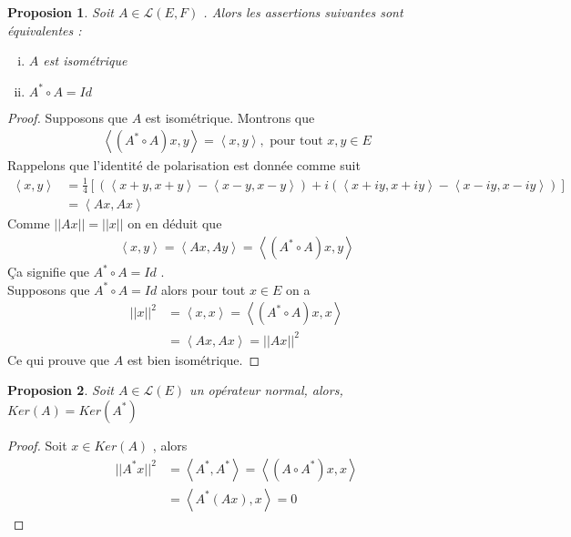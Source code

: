 \documentclass{report}
\newtheorem{Prop}{Proposion}[subsection]
\begin{document}
{\begin{Prop} Soit $A \in \mathscr{L}(E,F)$ . Alors les assertions suivantes sont équivalentes : \\
	\begin{enumerate}[i)]
	\item $A$ est isométrique \\
	\item $A^* \circ A = Id$ \\
	\end{enumerate}
\end{Prop}
\begin{proof}
Supposons que $A$ est isométrique. Montrons que 
					\begin{align*}
					 \left< (A^* \circ A)x,y \right> = \left< x,y \right> , \,\,\text{pour tout}\,\, x,y \in E
					\end{align*}
Rappelons que l'identité de polarisation est donnée comme suit 
					\begin{align*}
					 \left< x,y \right> &= \frac{1}{4} [ (\left< x+y,x+y \right> - \left< x-y,x-y \right>) + i(\left< x+iy,x+iy \right> - \left< x-iy,x-iy \right>) ] \\
					  		  &= \left< Ax,Ax \right>
					\end{align*}
Comme $||Ax|| = ||x||$ on en déduit que 
					\begin{align*}
					 \left< x,y \right> = \left< Ax,Ay \right> = \left< (A^*\circ A)x,y \right>
					\end{align*}
Ça signifie que $A^* \circ A = Id$ .\\
Supposons que $A^* \circ A = Id$ alors pour tout $x \in E$ on a 
					\begin{align*}
					 ||x||^2 &= \left< x,x \right> = \left< (A^*\circ A)x,x \right> \\
					 &= \left< Ax,Ax \right> = ||Ax||^2
					\end{align*}
Ce qui prouve que $A$ est bien isométrique.
\end{proof}


\begin{Prop} Soit $A \in \mathscr{L}(E)$ un opérateur normal, alors, $Ker(A) = Ker(A^*)$ \\
\end{Prop}
\begin{proof}
Soit $x \in Ker(A)$ , alors 
					\begin{align*}
					 ||A^* x||^2 &= \left< A^*,A^* \right> = \left< (A\circ A^*)x,x \right> \\
					 &= \left< A^*(Ax),x \right> = 0
					\end{align*}



\end{proof}}
\end{document}
